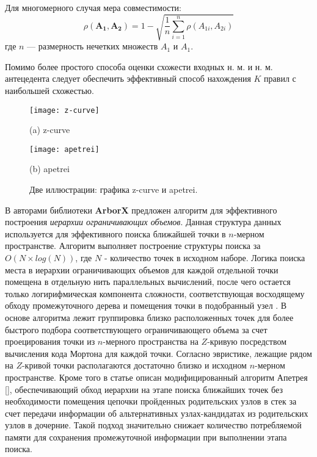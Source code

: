 Для многомерного случая мера совместимости:
\begin{equation*}
	\rho(\mathbf{A_1}, \mathbf{A_2}) = 1 - \sqrt{\frac{1}{n} \sum_{i=1}^{n} \rho(A_{1i}, A_{2i})}
\end{equation*}
где $n$ --- размерность нечетких множеств $A_1$ и $A_1$.

Помимо более простого способа оценки схожести входных н. м. и н. м. антецедента следует обеспечить эффективный способ нахождения $K$ правил с наибольшей схожестью.

\begin{figure}[hbt]
	\label{fig:z-curve-apetrei}
	\centering
	\begin{minipage}[b]{0.45\textwidth}
		\centering
		\texttt{[image: z-curve]}
		\caption*{(a) z-curve}
	\end{minipage}\hfill
	\begin{minipage}[b]{0.45\textwidth}
		\centering
		\texttt{[image: apetrei]}
		\caption*{(b) apetrei}
	\end{minipage}
	\caption{Две иллюстрации: графика z-curve и apetrei.}
\end{figure}

В \cite{prokopenko2024revisingapetreisboundingvolume} авторами библиотеки \textbf{ArborX} предложен алгоритм для эффективного построения \textit{иерархии ограничивающих объемов}. Данная структура данных используется для эффективного поиска ближайшей точки в $n$-мерном пространстве. Алгоритм выполняет построение структуры поиска за $O(N\times log(N))$, где $N$ - количество точек в исходном наборе. Логика поиска места в иерархии ограничивающих объемов для каждой отдельной точки помещена в отдельную нить параллельных вычислений, после чего остается только логирифмическая компонента сложности, соответствующая восходящему обходу промежуточного дерева и помещения точки в подобранный узел . В основе алгоритма лежит группировка близко расположенных точек для более быстрого подбора соответствующего ограничивающего объема за счет проецирования точки из $n$-мерного пространства на $Z$-кривую посредством вычисления кода Мортона для каждой точки. Согласно эвристике, лежащие рядом на $Z$-кривой точки располагаются достаточно близко и исходном $n$-мерном пространстве. Кроме того в статье описан модифицированный алгоритм Апетрея [], обеспечивающий обход иерархии на этапе поиска ближайших точек без необходимости помещения цепочки пройденных родительских узлов в стек за счет передачи информации об альтернативных узлах-кандидатах из родительских узлов в дочерние. Такой подход значительно снижает количество потребляемой памяти для сохранения промежуточной информации при выполнении этапа поиска.


